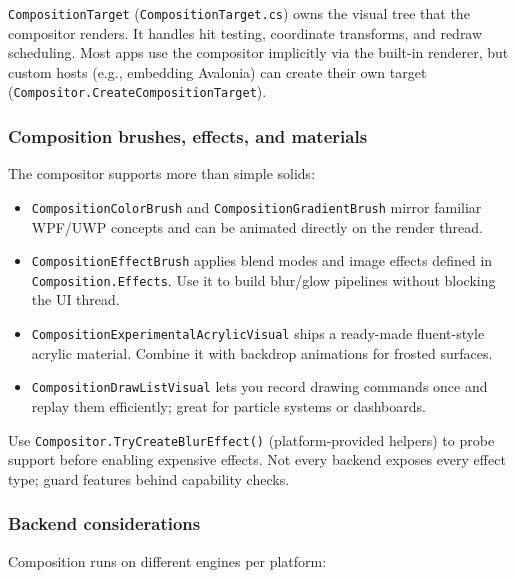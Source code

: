 \passthrough{\lstinline!CompositionTarget!}
(\passthrough{\lstinline!CompositionTarget.cs!}) owns the visual tree
that the compositor renders. It handles hit testing, coordinate
transforms, and redraw scheduling. Most apps use the compositor
implicitly via the built-in renderer, but custom hosts (e.g., embedding
Avalonia) can create their own target
(\passthrough{\lstinline!Compositor.CreateCompositionTarget!}).

\subsubsection{Composition brushes, effects, and
materials}\label{composition-brushes-effects-and-materials}

The compositor supports more than simple solids:

\begin{itemize}
\tightlist
\item
  \passthrough{\lstinline!CompositionColorBrush!} and
  \passthrough{\lstinline!CompositionGradientBrush!} mirror familiar
  WPF/UWP concepts and can be animated directly on the render thread.
\item
  \passthrough{\lstinline!CompositionEffectBrush!} applies blend modes
  and image effects defined in
  \passthrough{\lstinline!Composition.Effects!}. Use it to build
  blur/glow pipelines without blocking the UI thread.
\item
  \passthrough{\lstinline!CompositionExperimentalAcrylicVisual!} ships a
  ready-made fluent-style acrylic material. Combine it with backdrop
  animations for frosted surfaces.
\item
  \passthrough{\lstinline!CompositionDrawListVisual!} lets you record
  drawing commands once and replay them efficiently; great for particle
  systems or dashboards.
\end{itemize}

Use \passthrough{\lstinline!Compositor.TryCreateBlurEffect()!}
(platform-provided helpers) to probe support before enabling expensive
effects. Not every backend exposes every effect type; guard features
behind capability checks.

\subsubsection{Backend considerations}\label{backend-considerations}

Composition runs on different engines per platform:

